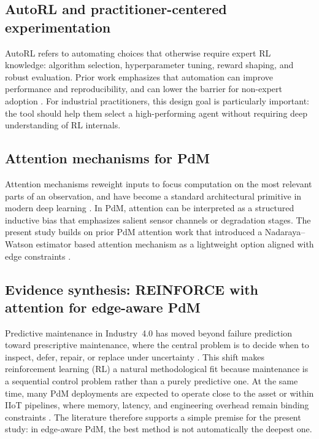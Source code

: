 \documentclass[refree,sn-basic]{sn-jnl} %
\begin{document}
\subsection{AutoRL and practitioner-centered experimentation}
AutoRL refers to automating choices that otherwise require expert RL knowledge: algorithm selection, hyperparameter tuning, reward shaping, and robust evaluation. Prior work emphasizes that automation can improve performance and reproducibility, and can lower the barrier for non-expert adoption \cite{Faust2019, Mussi2022}. For industrial practitioners, this design goal is particularly important: the tool should help them select a high-performing agent without requiring deep understanding of RL internals.

\subsection{Attention mechanisms for PdM}
Attention mechanisms reweight inputs to focus computation on the most relevant parts of an observation, and have become a standard architectural primitive in modern deep learning \cite{Vaswani2017}. In PdM, attention can be interpreted as a structured inductive bias that emphasizes salient sensor channels or degradation stages. The present study builds on prior PdM attention work that introduced a Nadaraya--Watson estimator based attention mechanism as a lightweight option aligned with edge constraints \cite{Siraskar2024}.

\subsection{Evidence synthesis: REINFORCE with attention for edge-aware PdM}
\label{sec:reinforce_attention_pdm}

Predictive maintenance in Industry~4.0 has moved beyond failure prediction toward prescriptive maintenance, where the central problem is to decide when to inspect, defer, repair, or replace under uncertainty \cite{Compare2020, Ansari2019, Siraskar2023, Zhang2024}. This shift makes reinforcement learning (RL) a natural methodological fit because maintenance is a sequential control problem rather than a purely predictive one. At the same time, many PdM deployments are expected to operate close to the asset or within IIoT pipelines, where memory, latency, and engineering overhead remain binding constraints \cite{Compare2020, Pandey2023, Njor2024}. The literature therefore supports a simple premise for the present study: in edge-aware PdM, the best method is not automatically the deepest one.
\end{document}
